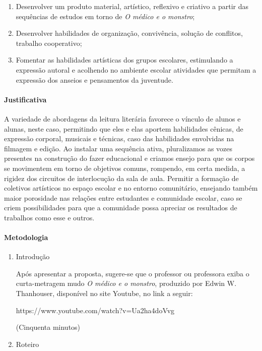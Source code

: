 \documentclass[12pt]{extarticle}
\begin{document}
{\begin{enumerate}
\item
Desenvolver um produto material, artístico, reflexivo e criativo a
partir das sequências de estudos em torno de \emph{O médico e o
monstro};

\item
Desenvolver habilidades de organização, convivência,
solução de conflitos, trabalho cooperativo; 

\item
Fomentar as habilidades
artísticas dos grupos escolares, estimulando a expressão autoral e
acolhendo no ambiente escolar atividades que permitam a expressão dos
anseios e pensamentos da juventude.
\end{enumerate}

\paragraph{Justificativa}
A variedade de abordagens da leitura literária favorece o vínculo de
alunos e alunas, neste caso, permitindo que eles e elas aportem
habilidades cênicas, de expressão corporal, musicais e técnicas, caso
das habilidades envolvidas na filmagem e edição. Ao instalar uma
sequência ativa, pluralizamos as vozes presentes na construção do fazer
educacional e criamos ensejo para que os corpos se movimentem em torno
de objetivos comuns, rompendo, em certa medida, a rigidez dos circuitos
de interlocução da sala de aula. Permitir a formação de coletivos
artísticos no espaço escolar e no entorno comunitário, ensejando também
maior porosidade nas relações entre estudantes e comunidade escolar,
caso se criem possibilidades para que a comunidade possa apreciar os
resultados de trabalhos como esse e outros.

\paragraph{Metodologia}
\begin{enumerate}
\item
Introdução

Após apresentar a proposta, sugere-se que o professor ou professora
exiba o curta-metragem mudo \emph{O médico e o monstro}, produzido por
Edwin W. Thanhouser, disponível no site Youtube, no link a seguir:

https://www.youtube.com/watch?v=Ua2ha4doVvg

(Cinquenta minutos)

\item
Roteiro


\end{enumerate}}
\end{document}
